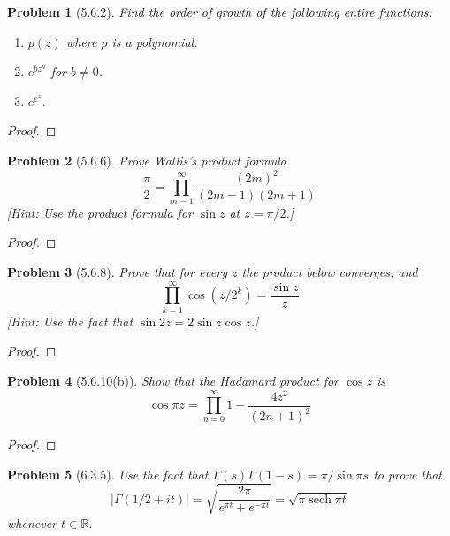 \documentclass[10pt]{article}
\newcommand{\sk}{\vskip 10mm}
\newcommand{\bb}[1]{\mathbb{#1}}
\DeclareMathOperator{\sech}{sech}
\theoremstyle{plain}
\newtheorem{problem}{Problem}
\theoremstyle{remark}
\begin{document}
\begin{problem}[5.6.2]
  Find the order of growth of the following entire functions:
  \begin{enumerate}
  \item[(a)] $p(z)$ where $p$ is a polynomial.
  \item[(b)] $e^{bz^n}$ for $b\neq 0$.
  \item[(c)] $e^{e^z}$.
  \end{enumerate}
\end{problem}

\begin{proof}
  
\end{proof}

\sk

\begin{problem}[5.6.6]
  Prove Wallis's product formula
  \[
    \frac{\pi}{2}=\prod_{m=1}^\infty\frac{(2m)^2}{(2m-1)(2m+1)}
  \]
  [Hint: Use the product formula for $\sin z$ at $z=\pi/2$.]
\end{problem}

\begin{proof}
  
\end{proof}

\sk

\begin{problem}[5.6.8]
  Prove that for every $z$ the product below converges, and
  \[
    \prod_{k=1}^\infty \cos(z/2^k)=\frac{\sin z}{z}
  \]
  [Hint: Use the fact that $\sin 2z=2\sin z\cos z$.]
\end{problem}

\begin{proof}
  
\end{proof}

\sk

\begin{problem}[5.6.10(b)]
  Show that the Hadamard product for $\cos z$ is 
  \[
    \cos\pi z=\prod_{n=0}^\infty 1-\frac{4z^2}{(2n+1)^2}
  \]
\end{problem}

\begin{proof}
  
\end{proof}

\sk

\begin{problem}[6.3.5]
  Use the fact that $\Gamma(s)\Gamma(1-s)=\pi/\sin\pi s$ to prove that
  \[
    |\Gamma(1/2+it)|=\sqrt{\frac{2\pi}{e^{\pi t}+e^{-\pi t}}}=\sqrt{\pi\sech{\pi t}}
  \]
  whenever $t\in \bb{R}$.
\end{problem}
\end{document}
